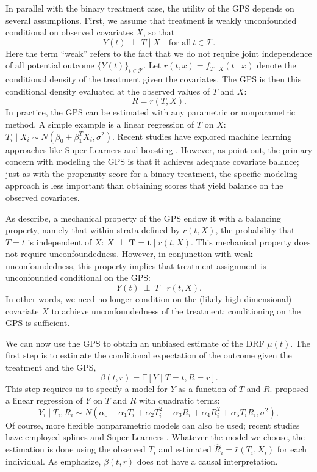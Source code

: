 \documentclass[11pt,a4paper]{article}
\begin{document}
In parallel with the binary treatment case, the utility of the GPS depends on several assumptions. First, we assume that treatment is weakly unconfounded conditional on observed covariates $X$, so that
\[
	Y(t) ~\perp~ T \mid X \quad \text{for all} ~ t \in \mathcal{T}.
\]
Here the term ``weak'' refers to the fact that we do not require joint independence of all potential outcome $\{Y(t)\}_{t \in \mathcal{T}}$. Let $r(t,x) = f_{T \mid X}(t \mid x)$ denote the conditional density of the treatment given the covariates. The GPS is then this conditional density evaluated at the observed values of $T$ and $X$:
\begin{equation}\label{eq:gps}
	R = r(T, X).
\end{equation}
In practice, the GPS can be estimated with any parametric or nonparametric method. A simple example is a linear regression of $T$ on $X$: $T_i \mid X_i \sim N(\beta_0 + \beta_1^T X_i, \sigma^2)$. Recent studies have explored machine learning approaches like Super Learners \citep{kreif_etal} and boosting \citep{zhu_etal}. However, as \cite{kluve_etal} point out, the primary concern with modeling the GPS is that it achieves adequate covariate balance; just as with the propensity score for a binary treatment, the specific modeling approach is less important than obtaining scores that yield balance on the observed covariates.

As \cite{hirano_imbens} describe, a mechanical property of the GPS endow it with a balancing property, namely that within strata defined by $r(t, X)$, the probability that $T=t$ is independent of $X$: $X ~\perp~ \mathbf{T=t} \mid r(t, X)$. This mechanical property does not require unconfoundedness. However, in conjunction with weak unconfoundedness, this property implies that treatment assignment is unconfounded conditional on the GPS:
\begin{equation}\label{eq:gps_unconf}
	Y(t) ~\perp~ T \mid r(t, X).
\end{equation}
In other words, we need no longer condition on the (likely high-dimensional) covariate $X$ to achieve unconfoundedness of the treatment; conditioning on the GPS is sufficient.

We can now use the GPS to obtain an unbiased estimate of the DRF $\mu(t)$. The first step is to estimate the conditional expectation of the outcome given the treatment and the GPS,
\begin{equation}\label{eq:beta}
	\beta(t,r) = \mathbb{E}[Y \mid T=t, R=r].
\end{equation}
This step requires us to specify a model for $Y$ as a function of $T$ and $R$. \cite{hirano_imbens} proposed a linear regression of $Y$ on $T$ and $R$ with  quadratic terms:
\[
	Y_i \mid T_i, R_i \sim N(\alpha_0 + \alpha_1 T_i + \alpha_2 T_i^2 + \alpha_3 R_i + \alpha_4 R_i^2 + \alpha_5 T_i R_i, \sigma^2),
\]
Of course, more flexible nonparametric models can also be used; recent studies have employed splines \citep{zhu_etal} and Super Learners \citep{kreif_etal}. Whatever the model we choose, the estimation is done using the observed $T_i$ and estimated $\widehat{R}_i = \widehat{r}(T_i, X_i)$ for each individual.  As \cite{hirano_imbens} emphasize, $\beta(t,r)$ does not have a causal interpretation.
\end{document}
